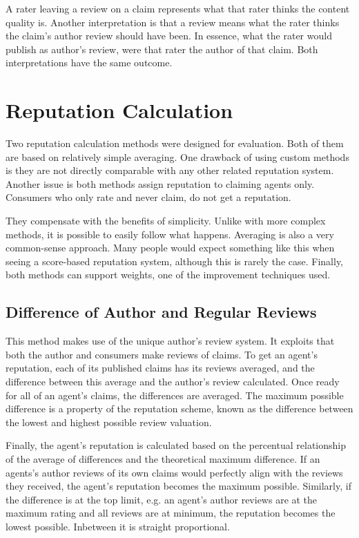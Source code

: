 \documentclass[%
    ]{\PathToTumTemplate/thesis/tum_thesis}
\begin{document}
A rater leaving a review on a claim represents what that rater thinks the content quality is.
Another interpretation is that a review means what the rater thinks the claim's author review should have been.
In essence, what the rater would publish as author's review, were that rater the author of that claim.
Both interpretations have the same outcome.




\section{Reputation Calculation}\label{sec:approach_reputation_calculation}
Two reputation calculation methods were designed for evaluation.
Both of them are based on relatively simple averaging.
One drawback of using custom methods is they are not directly comparable with any other related reputation system.
Another issue is both methods assign reputation to claiming agents only.
Consumers who only rate and never claim, do not get a reputation.

They compensate with the benefits of simplicity.
Unlike with more complex methods, it is possible to easily follow what happens.
Averaging is also a very common-sense approach.
Many people would expect something like this when seeing a score-based reputation system, although this is rarely the case.
Finally, both methods can support weights, one of the improvement techniques used.

\subsection{Difference of Author and Regular Reviews}
This method makes use of the unique author's review system.
It exploits that both the author and consumers make reviews of claims.
To get an agent's reputation, each of its published claims has its reviews averaged, and the difference between this average and the author's review calculated.
Once ready for all of an agent's claims, the differences are averaged.
The maximum possible difference is a property of the reputation scheme, known as the difference between the lowest and highest possible review valuation.

Finally, the agent's reputation is calculated based on the percentual relationship of the average of differences and the theoretical maximum difference.
If an agents's author reviews of its own claims would perfectly align with the reviews they received, the agent's reputation becomes the maximum possible.
Similarly, if the difference is at the top limit, e.g. an agent's author reviews are at the maximum rating and all reviews are at minimum, the reputation becomes the lowest possible.
Inbetween it is straight proportional.
\end{document}
